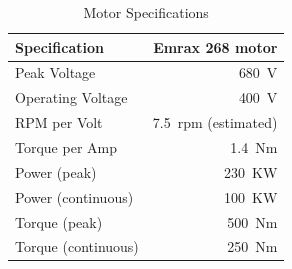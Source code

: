 \documentclass{report}
\begin{document}
    \begin{table}[H]
        \centering
        \begin{tabular}{@{}lr@{}} \toprule
            Specification & Emrax 268 motor\\ \midrule
            Peak Voltage & \SI{680}{V}\\
            Operating Voltage & \SI{400}{V}\\
            RPM per Volt & \SI{7.5}{rpm} (estimated)\\
            Torque per Amp & \SI{1.4}{Nm}\\
            Power (peak) & \SI{230}{KW}\\
            Power (continuous) & \SI{100}{KW}\\
            Torque (peak) & \SI{500}{Nm}\\
            Torque (continuous) & \SI{250}{Nm}\\ \bottomrule
        \end{tabular}
        \caption{Motor Specifications}
    \end{table}
    
\end{document}
